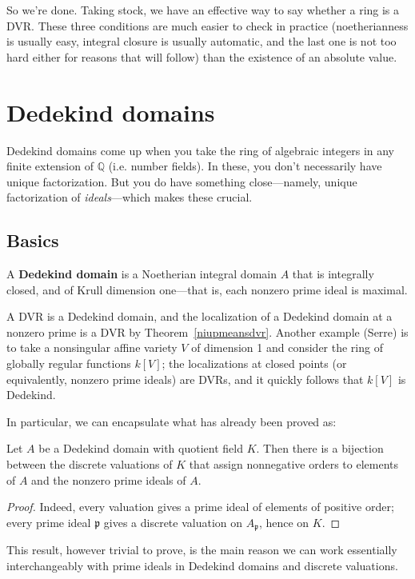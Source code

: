 So we're done.  Taking stock, we have an effective way to say whether a ring is a DVR.  These three conditions are much easier to check in practice (noetherianness is usually easy, integral closure is usually automatic, and the last one is not too hard either for reasons that will follow) than the existence of an absolute value.

\section{Dedekind domains}


Dedekind domains come up  when you take the ring of algebraic integers in any finite extension of $\mathbb{Q}$ (i.e. number fields).  In these, you don't necessarily have unique factorization.  But you do have something close---namely, unique factorization of \emph{ideals}---which makes these crucial.
\subsection{Basics}
\begin{definition} A \textbf{Dedekind domain} is a Noetherian integral domain $A$ that is  integrally closed, and of Krull dimension one---that is, each nonzero prime ideal is maximal.
\end{definition}

A DVR is a Dedekind domain, and the localization of a Dedekind domain at a nonzero prime is a DVR by Theorem~\ref{niupmeansdvr}.  Another example (Serre) is to take  a nonsingular affine  variety $V$ of dimension 1 and consider the ring of globally regular functions $k[V]$; the localizations at closed points (or equivalently, nonzero prime ideals) are DVRs, and it quickly follows that $k[V]$ is Dedekind.

In particular, we can encapsulate what has already been proved as:
\begin{theorem} Let $A$ be a Dedekind domain with quotient field $K$. Then there is a bijection between the discrete valuations of $K$ that assign nonnegative orders to elements of $A$ and the nonzero prime ideals of $A$.
\end{theorem}
\begin{proof} Indeed, every valuation gives a prime ideal of elements of positive order; every prime ideal $\mathfrak{p}$ gives a discrete valuation on $A_{\mathfrak{p}}$, hence on $K$. \end{proof}


This result, however trivial to prove, is the main reason we can work essentially interchangeably with prime ideals in Dedekind domains and discrete valuations.


